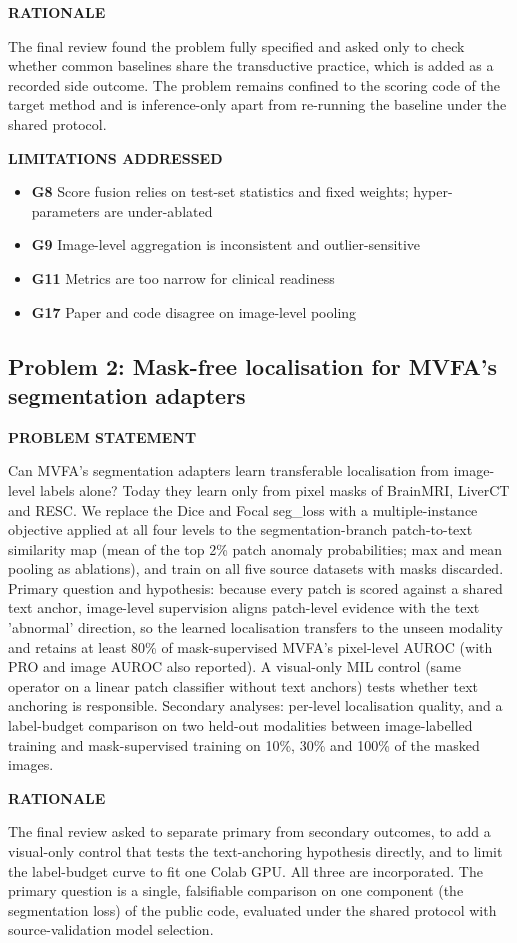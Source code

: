 \documentclass[11pt,a4paper]{article}
\newcommand{\lbl}[1]{{\sffamily\footnotesize\bfseries\color{muted}\MakeUppercase{#1}}\par}
\begin{document}
\lbl{Rationale}The final review found the problem fully specified and asked only to check whether common baselines share the transductive practice, which is added as a recorded side outcome. The problem remains confined to the scoring code of the target method and is inference-only apart from re-running the baseline under the shared protocol.

\lbl{Limitations addressed}\begin{itemize}[leftmargin=1.2em,itemsep=1pt,topsep=2pt]
\item \textbf{G8} Score fusion relies on test-set statistics and fixed weights; hyper-parameters are under-ablated
\item \textbf{G9} Image-level aggregation is inconsistent and outlier-sensitive
\item \textbf{G11} Metrics are too narrow for clinical readiness
\item \textbf{G17} Paper and code disagree on image-level pooling
\end{itemize}
\subsection{Problem 2: Mask-free localisation for MVFA's segmentation adapters}
\lbl{Problem statement}Can MVFA's segmentation adapters learn transferable localisation from image-level labels alone? Today they learn only from pixel masks of BrainMRI, LiverCT and RESC. We replace the Dice and Focal seg\_\allowbreak{}loss with a multiple-instance objective applied at all four levels to the segmentation-branch patch-to-text similarity map (mean of the top 2\% patch anomaly probabilities; max and mean pooling as ablations), and train on all five source datasets with masks discarded. Primary question and hypothesis: because every patch is scored against a shared text anchor, image-level supervision aligns patch-level evidence with the text 'abnormal' direction, so the learned localisation transfers to the unseen modality and retains at least 80\% of mask-supervised MVFA's pixel-level AUROC (with PRO and image AUROC also reported). A visual-only MIL control (same operator on a linear patch classifier without text anchors) tests whether text anchoring is responsible. Secondary analyses: per-level localisation quality, and a label-budget comparison on two held-out modalities between image-labelled training and mask-supervised training on 10\%, 30\% and 100\% of the masked images.

\lbl{Rationale}The final review asked to separate primary from secondary outcomes, to add a visual-only control that tests the text-anchoring hypothesis directly, and to limit the label-budget curve to fit one Colab GPU. All three are incorporated. The primary question is a single, falsifiable comparison on one component (the segmentation loss) of the public code, evaluated under the shared protocol with source-validation model selection.
\end{document}
